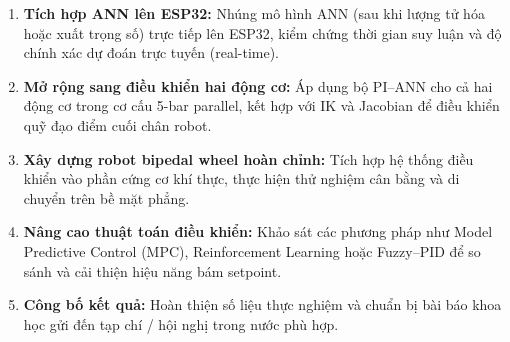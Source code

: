 \begin{enumerate}[leftmargin=1.5cm, label=\arabic*.]
    \item \textbf{Tích hợp ANN lên ESP32:} Nhúng mô hình ANN (sau khi lượng tử hóa
    hoặc xuất trọng số) trực tiếp lên ESP32, kiểm chứng thời gian suy luận
    và độ chính xác dự đoán trực tuyến (real-time).

    \item \textbf{Mở rộng sang điều khiển hai động cơ:} Áp dụng bộ PI--ANN cho
    cả hai động cơ trong cơ cấu 5-bar parallel, kết hợp với IK và Jacobian để
    điều khiển quỹ đạo điểm cuối chân robot.

    \item \textbf{Xây dựng robot bipedal wheel hoàn chỉnh:} Tích hợp hệ thống
    điều khiển vào phần cứng cơ khí thực, thực hiện thử nghiệm cân bằng và
    di chuyển trên bề mặt phẳng.

    \item \textbf{Nâng cao thuật toán điều khiển:} Khảo sát các phương pháp
    như Model Predictive Control (MPC), Reinforcement Learning hoặc
    Fuzzy--PID để so sánh và cải thiện hiệu năng bám setpoint.

    \item \textbf{Công bố kết quả:} Hoàn thiện số liệu thực nghiệm và chuẩn bị
    bài báo khoa học gửi đến tạp chí / hội nghị trong nước phù hợp.
\end{enumerate}
